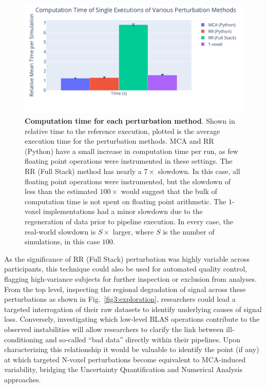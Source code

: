\documentclass[fleqn,12pt]{SelfArx_ch} %
\begin{document}
\begin{figure}[b!]
\centerline{\includegraphics[width=\linewidth]{figures/fig6_timing.pdf}}
\caption{\textbf{Computation time for each perturbation method}. Shown in relative
time to the reference execution, plotted is the average execution time for the
perturbation methods. MCA and RR (Python) have a small increase in computation
time per run, as few floating point operations were instrumented in these settings.
The RR (Full Stack) method has nearly a $7 \times$ slowdown. In this case, all
floating point operations were instrumented, but the slowdown of less than the
estimated $100 \times$ would suggest that the bulk of computation time is not spent
on floating point arithmetic. The $1$-voxel implementations had a minor slowdown due
to the regeneration of data prior to pipeline execution. In every case, the
real-world slowdown is $S \times$ larger, where $S$ is the number of simulations,
in this case $100$.}
\label{fig5:timing}
\end{figure}

As the significance of RR (Full Stack) perturbation was highly variable across participants, this technique could also
be used for automated quality control, flagging high-variance subjects for further inspection or exclusion from
analyses. From the top level, inspecting the regional degradation of signal across these perturbations as shown in
Fig.~\ref{fig3:exploration}, researchers could lead a targeted interrogation of their raw datasets to identify
underlying causes of signal loss. Conversely, investigating which low-level BLAS operations contribute to the observed
instabilities will allow researchers to clarify the link between ill-conditioning and so-called ``bad data'' directly
within their pipelines. Upon characterizing this relationship it would be valuable to identify the point (if any) at
which targeted N-voxel perturbations become equivalent to MCA-induced variability, bridging the Uncertainty
Quantification and Numerical Analysis approaches.
\end{document}
